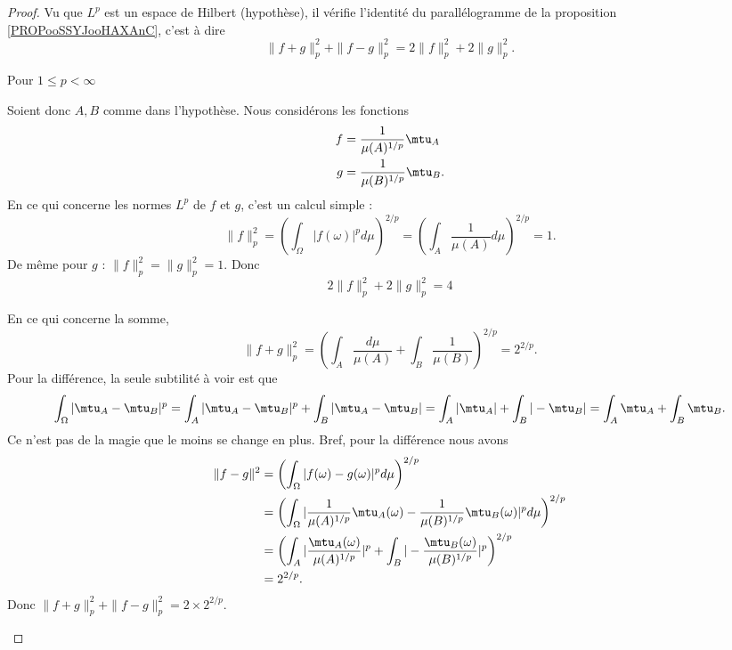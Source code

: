 \begin{proof}
    Vu que \( L^p\) est un espace de Hilbert (hypothèse), il vérifie l'identité du parallélogramme de la proposition \ref{PROPooSSYJooHAXAnC}, c'est à dire
    \begin{equation}        \label{EQooAKKYooURIbvi}
        \| f+g \|^2_p+\| f-g \|^2_p=2\| f \|_p^2+2\| g \|^2_p.
    \end{equation}

    \begin{subproof}
    \item[Pour \( 1\leq p<\infty\)]
        

    Soient donc \( A,B\) comme dans l'hypothèse. Nous considérons les fonctions
    \begin{subequations}
        \begin{align}
            f&=\frac{1}{ \mu(A)^{1/p} }\mtu_A\\
            g&=\frac{1}{ \mu(B)^{1/p} }\mtu_B.
        \end{align}
    \end{subequations}
    En ce qui concerne les normes \( L^p\) de \( f\) et \( g\), c'est un calcul simple :
    \begin{equation}
        \| f \|_p^2=\left( \int_{\Omega}| f(\omega) |^pd\mu \right)^{2/p}=\left( \int_A\frac{1}{ \mu(A) }d\mu \right)^{2/p}=1.
    \end{equation}
    De même pour \( g\) : \( \| f \|_p^2=\| g \|_p^2=1\). Donc
    \begin{equation}
        2\| f \|_p^2+2\| g \|_p^2=4
    \end{equation}

    En ce qui concerne la somme,
    \begin{equation}
        \| f+g \|_p^2=\left( \int_A\frac{ d\mu }{ \mu(A) }+\int_B\frac{1}{ \mu(B) } \right)^{2/p}=2^{2/p}.
    \end{equation}
    Pour la différence, la seule subtilité à voir est que
    \begin{equation}
        \int_{\Omega}| \mtu_A-\mtu_B |^p=\int_A| \mtu_A-\mtu_B |^p+\int_B| \mtu_A-\mtu_B |=\int_A| \mtu_A |+\int_B| -\mtu_B |=\int_A\mtu_A+\int_B\mtu_B.
    \end{equation}
    Ce n'est pas de la magie que le moins se change en plus. Bref, pour la différence nous avons
    \begin{subequations}
        \begin{align}
            \| f-g \|^2&=\left( \int_{\Omega}| f(\omega)-g(\omega) |^pd\mu \right)^{2/p}\\
            &=\left( \int_{\Omega}| \frac{1}{ \mu(A)^{1/p} }\mtu_A(\omega)-\frac{1}{ \mu(B)^{1/p} }\mtu_B(\omega) |^pd\mu \right)^{2/p}\\
            &=\left( \int_A| \frac{ \mtu_A(\omega) }{ \mu(A)^{1/p} } |^p   +\int_B| -\frac{ \mtu_B(\omega) }{ \mu(B)^{1/p} } |^p    \right)^{2/p}\\
            &=2^{2/p}.
        \end{align}
    \end{subequations}
    Donc \( \| f+g \|^{2}_p+\| f-g \|_p^2=2\times 2^{2/p}\).


\end{subproof}
\end{proof}
